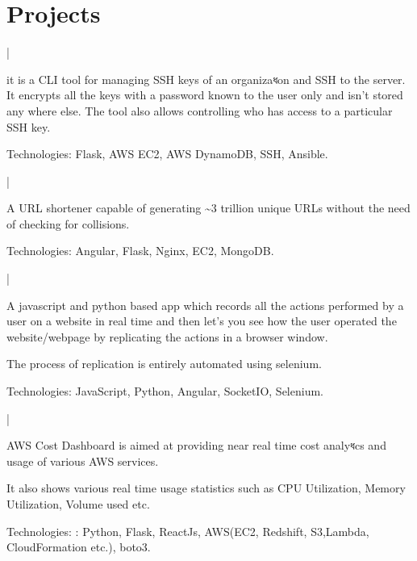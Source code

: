\documentclass[letterpaper]{main}
\begin{document}
\begin{minipage}[t]{0.66\textwidth}
\section{Projects}

 |
\begin{tightitemize}
\item it is a CLI tool for managing SSH keys of an organizaধon and SSH to
the server. It encrypts all the keys with a password known to the user
only and isn’t stored any where else. The tool also allows controlling
who has access to a particular SSH key. \\
\item Technologies: Flask, AWS EC2, AWS DynamoDB, SSH, Ansible.\\
\end{tightitemize}
\sectionspace 

 |
\begin{tightitemize}
\item A URL shortener capable of generating \textasciitilde3 trillion unique URLs without the need of checking for collisions. \\
\item  Technologies: Angular, Flask, Nginx, EC2, MongoDB. \\
\end{tightitemize}
\sectionspace 

 |
\begin{tightitemize}
\item A javascript and python based app which records all the actions performed by a user on a website in real time and then let's you see how the user operated the website/webpage by replicating the actions in a browser window. \\
\item  The process of replication is entirely automated using selenium. \\
\item Technologies: JavaScript, Python, Angular, SocketIO, Selenium.
\end{tightitemize}
\sectionspace 

 |
\begin{tightitemize}
\item AWS Cost Dashboard is aimed at providing near real time cost analyধcs and usage of various AWS services. \\
\item  It also shows various real time usage statistics such as CPU Utilization, Memory Utilization, Volume used etc. \\
\item Technologies: : Python, Flask, ReactJs, AWS(EC2, Redshift, S3,Lambda, CloudFormation etc.), boto3.
\end{tightitemize}

\end{minipage}
\end{document}
